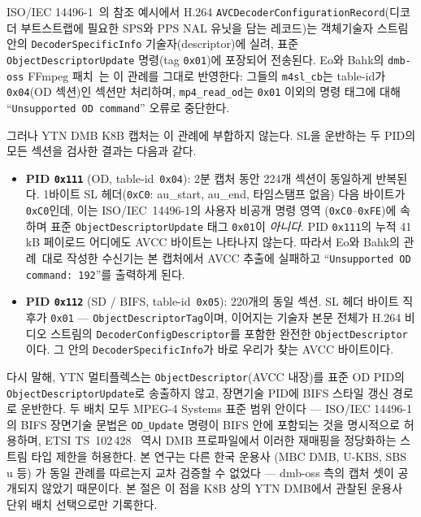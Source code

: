 \documentclass[11pt,a4paper]{article}
\begin{document}
ISO/IEC 14496-1~\cite{iso14496-1}의 참조 예시에서 H.264
\texttt{AVCDecoderConfigurationRecord}(디코더 부트스트랩에 필요한
SPS와 PPS NAL 유닛을 담는 레코드)는 객체기술자 스트림 안의
\texttt{DecoderSpecificInfo} 기술자(descriptor)에 실려, 표준
\texttt{ObjectDescriptorUpdate} 명령(tag \texttt{0x01})에 포장되어
전송된다.  Eo와 Bahk의 \texttt{dmb-oss} FFmpeg 패치~\cite{eo2024tdmb}는
이 관례를 그대로 반영한다: 그들의 \texttt{m4sl\_cb}는 table-id가
\texttt{0x04}(OD 섹션)인 섹션만 처리하며, \texttt{mp4\_read\_od}는
\texttt{0x01} 이외의 명령 태그에 대해 ``\texttt{Unsupported OD command}''
오류로 중단한다.

그러나 YTN DMB K8B 캡처는 이 관례에 부합하지 않는다.  SL을 운반하는
두 PID의 모든 섹션을 검사한 결과는 다음과 같다.

\begin{itemize}[leftmargin=*,nosep]
\item \textbf{PID \texttt{0x111}} (OD, table-id~\texttt{0x04}):
       2분 캡처 동안 224개 섹션이 동일하게 반복된다.  1바이트 SL
       헤더(\texttt{0xC0}: au\_start, au\_end, 타임스탬프 없음)
       다음 바이트가 \texttt{0xC0}인데, 이는 ISO/IEC~14496-1의
       사용자 비공개 명령 영역
       (\texttt{0xC0}--\texttt{0xFE})에 속하며 표준
       \texttt{ObjectDescriptorUpdate} 태그 \texttt{0x01}이 \emph{아니다}.
       PID \texttt{0x111}의 누적 41\,kB 페이로드 어디에도 AVCC
       바이트는 나타나지 않는다.  따라서 Eo와 Bahk의
       관례~\cite{eo2024tdmb}대로 작성한 수신기는 본 캡처에서 AVCC
       추출에 실패하고 ``\texttt{Unsupported OD command: 192}''를
       출력하게 된다.
\item \textbf{PID \texttt{0x112}} (SD / BIFS, table-id~\texttt{0x05}):
       220개의 동일 섹션.  SL 헤더 바이트 직후가 \texttt{0x01} ---
       \texttt{ObjectDescriptorTag}이며, 이어지는 기술자 본문 전체가
       H.264 비디오 스트림의 \texttt{DecoderConfigDescriptor}를 포함한
       완전한 \texttt{ObjectDescriptor}이다.  그 안의
       \texttt{DecoderSpecificInfo}가 바로 우리가 찾는 AVCC 바이트이다.
\end{itemize}

다시 말해, YTN 멀티플렉스는 \texttt{ObjectDescriptor}(AVCC 내장)를
표준 OD PID의 \texttt{ObjectDescriptorUpdate}로 송출하지 않고, 장면기술
PID에 BIFS 스타일 갱신 경로로 운반한다.  두 배치 모두 MPEG-4 Systems
표준 범위 안이다 --- ISO/IEC 14496-1의 BIFS 장면기술 문법은 \texttt{OD\_Update}
명령이 BIFS 안에 포함되는 것을 명시적으로 허용하며, ETSI
TS~102\,428~\cite{etsi102428} 역시 DMB 프로파일에서 이러한 재매핑을 정당화하는
스트림 타입 제한을 허용한다.  본 연구는 다른 한국 운용사 (MBC DMB, U-KBS,
SBS u 등) 가 동일 관례를 따르는지 교차 검증할 수 없었다 --- dmb-oss 측의
캡처 셋이 공개되지 않았기 때문이다.  본 절은 이 점을 K8B 상의 YTN DMB에서
관찰된 운용사 단위 배치 선택으로만 기록한다.
\end{document}
